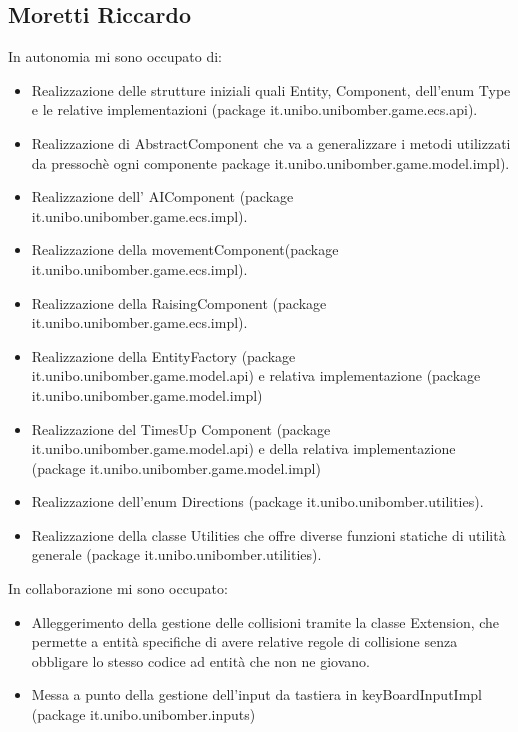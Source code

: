 \documentclass[a4paper,12pt]{report}
\begin{document}
\subsection*{Moretti Riccardo}
In autonomia mi sono occupato di:
\begin{itemize}
    \item Realizzazione delle strutture iniziali quali Entity, Component, dell’enum Type e le relative implementazioni (package it.unibo.unibomber.game.ecs.api).
    \item Realizzazione di AbstractComponent che va a generalizzare i metodi utilizzati da pressochè ogni componente package it.unibo.unibomber.game.model.impl).
    \item Realizzazione dell’ AIComponent (package it.unibo.unibomber.game.ecs.impl).
    \item Realizzazione della movementComponent(package it.unibo.unibomber.game.ecs.impl).
    \item Realizzazione della RaisingComponent (package it.unibo.unibomber.game.ecs.impl).
    \item Realizzazione della EntityFactory (package it.unibo.unibomber.game.model.api) e relativa implementazione (package it.unibo.unibomber.game.model.impl)
    \item Realizzazione del TimesUp Component (package it.unibo.unibomber.game.model.api) e della relativa implementazione (package it.unibo.unibomber.game.model.impl)
    \item Realizzazione dell’enum Directions (package it.unibo.unibomber.utilities).
    \item Realizzazione della classe Utilities che offre diverse funzioni statiche di utilità generale (package it.unibo.unibomber.utilities).
\end{itemize}
In collaborazione mi sono occupato:
\begin{itemize}
    \item Alleggerimento della gestione delle collisioni tramite la classe Extension, che permette a entità specifiche di avere relative regole di collisione senza obbligare lo stesso codice ad entità che non ne giovano.
    \item Messa a punto della gestione
          dell’input da tastiera in keyBoardInputImpl (package it.unibo.unibomber.inputs)
\end{itemize}
\end{document}
